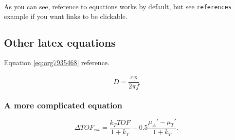 As you can see, reference to equations works by default, but see \texttt{references}
example if you want links to be clickable.

\subsection{Other latex equations}
\label{sec:org4384839}
Equation \ref{eq:org7935468} reference.

\begin{equation}
\label{eq:org7935468}
D = \frac{c\phi}{2\pi f}
\end{equation}

\subsubsection{A more complicated equation}
\label{sec:org53e6b5b}

\begin{equation}
\Delta TOF_{est} = \frac{k_T TOF}{1+k_T } - 0.5 \frac{\mu_A' - \mu_T'}{1+k_T}.
\end{equation}


